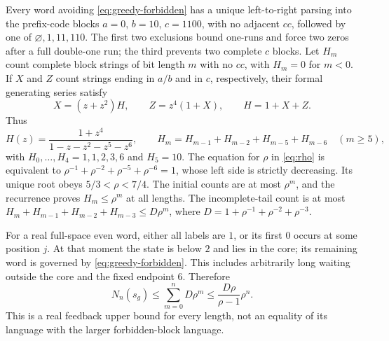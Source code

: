 \documentclass[11pt,reqno]{amsart}
\numberwithin{equation}{section}
\theoremstyle{definition}
\begin{document}
Every word avoiding \eqref{eq:greedy-forbidden} has a unique
left-to-right parsing into the prefix-code blocks
$a=0$, $b=10$, $c=1100$, with no adjacent $cc$, followed by
one of $\varnothing,1,11,110$. The first two exclusions bound
one-runs and force two zeros after a full double-one run; the third
prevents two complete $c$ blocks. Let $H_m$ count complete block
strings of bit length $m$ with no $cc$, with $H_m=0$ for
$m<0$. If $X$ and $Z$ count strings ending in $a/b$ and in
$c$, respectively, their formal generating series satisfy
\[
 X=(z+z^2)H,\qquad Z=z^4(1+X),\qquad H=1+X+Z.
\]
Thus
\begin{equation}\label{eq:greedy-H}
 H(z)=\frac{1+z^4}{1-z-z^2-z^5-z^6},\qquad
 H_m=H_{m-1}+H_{m-2}+H_{m-5}+H_{m-6}\quad(m\ge5),
\end{equation}
with $H_0,\ldots,H_4=1,1,2,3,6$ and $H_5=10$.
The equation for $\rho$ in \eqref{eq:rho} is equivalent to
$\rho^{-1}+\rho^{-2}+\rho^{-5}+\rho^{-6}=1$, whose left side
is strictly decreasing. Its unique root obeys $5/3<\rho<7/4$.
The initial counts are at most $\rho^m$, and the recurrence
proves $H_m\le\rho^m$ at all lengths. The incomplete-tail
count is at most
$H_m+H_{m-1}+H_{m-2}+H_{m-3}\le D\rho^m$, where
$D=1+\rho^{-1}+\rho^{-2}+\rho^{-3}$.

For a real full-space even word, either all labels are $1$, or its
first $0$ occurs at some position $j$. At that moment the state
is below $2$ and lies in the core; its remaining word is governed
by \eqref{eq:greedy-forbidden}. This includes arbitrarily long
waiting outside the core and the fixed endpoint $6$.
Therefore
\begin{equation}\label{eq:greedy-upper}
 N_n(s_g)\le\sum_{m=0}^n D\rho^m
 \le\frac{D\rho}{\rho-1}\rho^n.
\end{equation}
This is a real feedback upper bound for every length, not an equality
of its language with the larger forbidden-block language.
\end{document}
